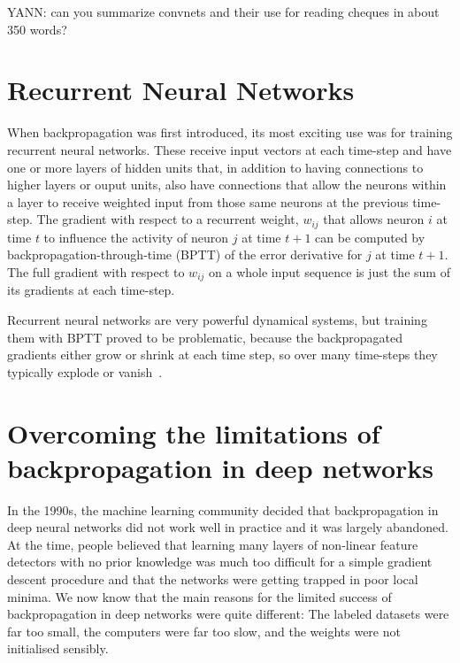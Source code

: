 \documentclass[]{article}
\begin{document}

YANN: can you summarize convnets and their use for reading cheques in about
350 words?

\citep{LeCun89-small}


\section{Recurrent Neural Networks}

When backpropagation was first introduced, its most exciting use was for
training recurrent neural networks. These receive input vectors at each
time-step and have one or more layers of hidden units that, in addition to
having connections to higher layers or ouput units, also have connections
that allow the neurons within a layer to receive weighted input from those
same neurons at the previous time-step.  The gradient with respect to a recurrent
weight, $w_{ij}$ that allows neuron $i$ at time $t$ to influence the
activity of neuron $j$ at time $t+1$ can be computed by
backpropagation-through-time (BPTT) of the error derivative for $j$ at time
$t+1$. The full gradient with respect to $w_{ij}$ on a whole input sequence is just the
sum of its gradients at each time-step.

Recurrent neural networks are very powerful dynamical systems, but training
them with BPTT proved to be problematic, because the backpropagated
gradients either grow or shrink at each time step, so over many time-steps
they typically explode or vanish~\citep{Bengio-et-al-TNN1994,Hochreiter91-small}.

\section{Overcoming the limitations of backpropagation in deep networks}

In the 1990s, the machine learning community decided that backpropagation
in deep neural networks did not work well in practice and it was largely
abandoned.  At the time, people believed that learning many layers of
non-linear feature detectors with no prior knowledge was much too difficult
for a simple gradient descent procedure and that the networks were getting
trapped in poor local minima. We now know that the main reasons for the
limited success of backpropagation in deep networks were quite different:
The labeled datasets were far too small, the computers were far too slow,
and the weights were not initialised sensibly.
\end{document}
